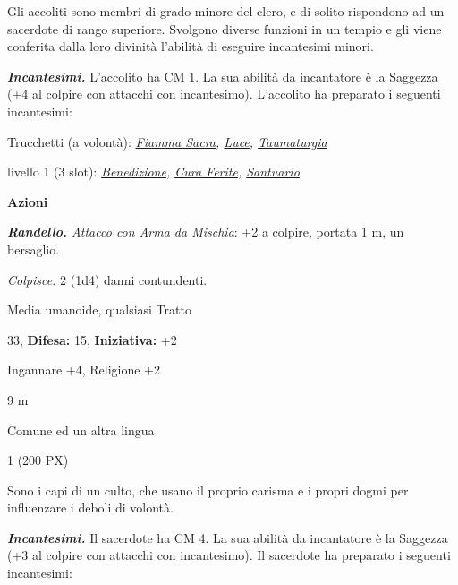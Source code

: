 \begin{multicols}{2}
{Gli accoliti sono membri di grado minore del clero, e di solito rispondono ad un sacerdote di rango superiore. Svolgono diverse funzioni in un tempio e gli viene conferita dalla loro divinità l'abilità di eseguire incantesimi minori.

\emph{\textbf{Incantesimi.}} L'accolito ha CM 1. La sua abilità da incantatore è la Saggezza (+4 al colpire con attacchi con incantesimo). L'accolito ha preparato i seguenti incantesimi:

Trucchetti (a volontà): \emph{\hyperlink{Fiamma Sacra}{Fiamma Sacra}, \hyperlink{Luce}{Luce}, \hyperlink{Taumaturgia}{Taumaturgia}}

livello 1 (3 slot): \emph{\hyperlink{Benedizione}{Benedizione}, \hyperlink{Cura Ferite}{Cura Ferite}, \hyperlink{Santuario}{Santuario}}

\medskip\textbf{Azioni}

\emph{\textbf{Randello.} Attacco con Arma da Mischia}: +2 a colpire, portata 1 m, un bersaglio.

\emph{Colpisce:} 2 (1d4) danni contundenti.

\begin{description}[noitemsep, topsep=0pt, parsep=0pt, partopsep=0pt, leftmargin=0cm, labelwidth=2.2cm]
    \item[\textbf{Taglia/Tipo:}] Media umanoide, qualsiasi Tratto
    \item[\textbf{Caratt.:}] 
    \item[\textbf{Punti Ferita:}] 33,  \textbf{Difesa:} 15,  \textbf{Iniziativa:} +2
    \item[\textbf{Comp.:}] Ingannare +4, Religione +2
    \item[\textbf{Tiri Salvez.:}] 
    \item[\textbf{Movimento:}] 9 m
    \item[\textbf{Linguaggi:}] Comune ed un altra lingua
    \item[\textbf{Sfida:}] 1 (200 PX)\smallskip
\end{description}

Sono i capi di un culto, che usano il proprio carisma e i propri dogmi per influenzare i deboli di volontà.

\emph{\textbf{Incantesimi.}} Il sacerdote ha CM 4. La sua abilità da incantatore è la Saggezza (+3 al colpire con attacchi con incantesimo). Il sacerdote ha preparato i seguenti incantesimi:

}
\end{multicols}
